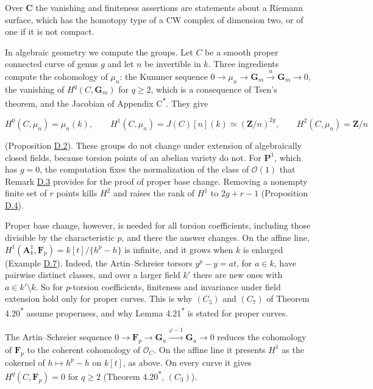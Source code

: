\documentclass[11pt]{article}
\newcommand{\bpout}[1]{#1\textsuperscript{\hyperlink{bp-outside}{\ensuremath{\ast}}}}
\begin{document}
Over \(\mathbf C\) the vanishing and finiteness assertions are statements about a Riemann surface, which has the homotopy type of a CW complex of dimension two, or of one if it is not compact.

In algebraic geometry we compute the groups. Let \(C\) be a smooth proper connected curve of genus \(g\) and let \(n\) be invertible in \(k\). Three ingredients compute the cohomology of \(\mu_n\): the Kummer sequence \(0\to\mu_n\to\mathbf G_m\xrightarrow{n}\mathbf G_m\to0\), the vanishing of \(H^q(C,\mathbf G_m)\) for \(q\geq2\), which is a consequence of Tsen's theorem, and the Jacobian of Appendix \bpout{C}. They give

\[
H^0(C,\mu_n)=\mu_n(k),\qquad H^1(C,\mu_n)=J(C)[n](k)\simeq(\mathbf Z/n)^{2g},
\qquad H^2(C,\mu_n)=\mathbf Z/n
\]

(Proposition \hyperref[bp8]{D.2}). These groups do not change under extension of algebraically closed fields, because torsion points of an abelian variety do not. For \(\mathbf P^1\), which has \(g=0\), the computation fixes the normalization of the class of \(\mathcal O(1)\) that Remark \hyperref[bp10]{D.3} provides for the proof of proper base change. Removing a nonempty finite set of \(r\) points kills \(H^2\) and raises the rank of \(H^1\) to \(2g+r-1\) (Proposition \hyperref[bp13]{D.4}).

Proper base change, however, is needed for all torsion coefficients, including those divisible by the characteristic \(p\), and there the answer changes. On the affine line, \(H^1(\mathbf A^1_k,\mathbf F_p)=k[t]/\{h^p-h\}\) is infinite, and it grows when \(k\) is enlarged (Example \hyperref[bp24]{D.7}). Indeed, the Artin–Schreier torsors \(y^p-y=at\), for \(a\in k\), have pairwise distinct classes, and over a larger field \(k'\) there are new ones with \(a\in k'\setminus k\). So for \(p\)-torsion coefficients, finiteness and invariance under field extension hold only for proper curves. This is why \((C_5)\) and \((C_7)\) of Theorem \bpout{4.20} assume properness, and why Lemma \bpout{4.21} is stated for proper curves.

The Artin–Schreier sequence \(0\to\mathbf F_p\to\mathbf G_a\xrightarrow{\varphi-1}\mathbf G_a\to0\) reduces the cohomology of \(\mathbf F_p\) to the coherent cohomology of \(\mathcal O_C\). On the affine line it presents \(H^1\) as the cokernel of \(h\mapsto h^p-h\) on \(k[t]\), as above. On every curve it gives \(H^q(C,\mathbf F_p)=0\) for \(q\geq2\) (Theorem \bpout{4.20}, \((C_3)\)).
\end{document}
